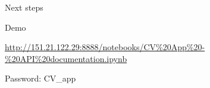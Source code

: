 \begin{frame}{Next steps}
\begin{fullpageitemize}
  \item \begin{center}\end{center}
  \item \begin{center}\end{center}
  \item \begin{center}\end{center}
 \end{fullpageitemize}
\end{frame}


\begin{frame}{Demo}
\begin{center}
\color{colorblue}\url{http://151.21.122.29:8888/notebooks/CV\%20App\%20-\%20API\%20documentation.ipynb}
\end{center}
\begin{footnotesize}
\color{colordgray}
Password: CV\_app
\end{footnotesize}
\end{frame}